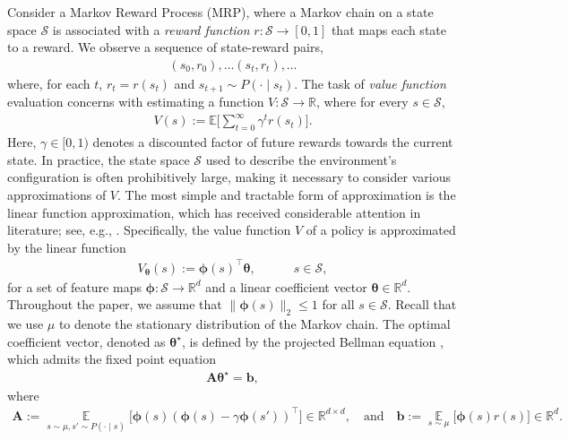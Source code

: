 Consider a Markov Reward Process (MRP), where a Markov chain  on a state space $\mathcal{S}$ is associated with a \emph{reward function} $r: \mathcal{S} \to [0,1]$ that maps each state to a reward. 
We observe a sequence of state-reward pairs, 
\begin{align*}
	(s_0,r_0),\ldots (s_t, r_t),\ldots
\end{align*}
where, for each $t$, $r_t = r(s_t)$ and $s_{t+1} \sim P(\cdot \mid s_t)$. 
The task of \emph{value function} evaluation concerns with estimating a function $V:\mathcal{S} \to \mathbb{R}$, where  for every $s \in \mathcal{S}$, 
\begin{align*}
	V(s):=\mathbb{E} \Bigg[\sum_{t=0}^\infty \gamma^t r(s_t)\Bigg].
\end{align*}
Here, $\gamma \in [0,1)$ denotes a discounted factor of future rewards towards the current state. 
In practice, the state space $\mathcal{S}$ used to describe the environment's configuration is often prohibitively large, making it necessary to consider various approximations of $V$. The most simple and tractable form of approximation is the linear function approximation, which has received considerable attention in literature; see, e.g., \cite{bhandari2018finite,patil2023finite,dalal2018finite,li2023sharp,samsonov2023finitesample,samsonov2024gaussian,wu2024statistical}.  
Specifically, the value function $V$ of a policy is approximated by the linear function
\begin{align}\label{eq:linear-approximation}
	 V_{\bm\theta}(s) := {\bm\phi}(s)^\top {\bm\theta}, \qquad \quad  s \in \mathcal{S},
\end{align}
for a set of feature maps $\bm{\phi}: \mathcal{S} \to \mathbb{R}^d$ and a linear coefficient vector  $\bm{\theta} \in \mathbb{R}^d$. Throughout the paper, we assume that $\|\bm{\phi}(s)\|_2 \leq 1$ for all $s \in \mathcal{S}$. 
Recall that we use $\mu$ to denote the stationary distribution of the Markov chain. 
The optimal coefficient vector, denoted as $\bm{\theta}^\star$, is defined by the projected Bellman equation \citep{tsitsiklis1997analysis}, which admits the fixed point equation 
\begin{align}
\label{eq:defn-theta-star}
\bm{A} \bm{\theta}^{\star}=\bm{b}, 
\end{align}
where %
\begin{align}
	\bm{A} :=\mathop{\mathbb{E}}\limits _{s\sim\mu,s'\sim P(\cdot\mid s)}\Big[\bm{\phi}(s)\left(\bm{\phi}(s)-\gamma\bm{\phi}(s')\right)^{\top}\Big]\in\mathbb{R}^{d\times d},\quad
	\text{and}\quad \bm{b} :=\mathop{\mathbb{E}}\limits _{s\sim\mu}\Big[\bm{\phi}(s)r(s)\Big]\in\mathbb{R}^{d}.
	\label{eq:defn-At-mean}
\end{align}
